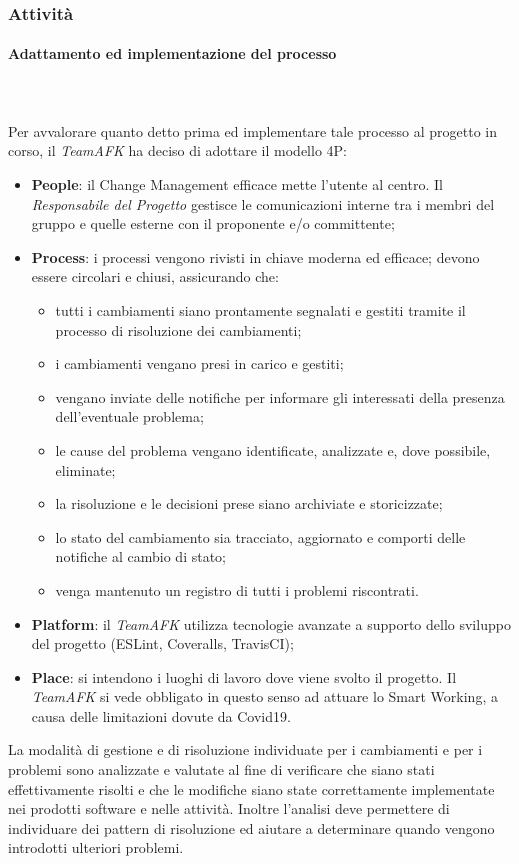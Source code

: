 \subsubsection{Attività}
\paragraph{Adattamento ed implementazione del processo}\mbox{} \\ \mbox{} \\
Per avvalorare quanto detto prima ed implementare tale processo al progetto in corso, il \textit{TeamAFK} ha deciso di adottare il modello 4P: \begin{itemize}
\item \textbf{People}: il Change Management efficace mette l'utente al centro. Il \textit{Responsabile del Progetto} gestisce le comunicazioni interne tra i membri del gruppo e quelle esterne con il proponente e/o committente;
\item \textbf{Process}: i processi vengono rivisti in chiave moderna ed efficace; devono essere circolari e chiusi, assicurando che: \begin{itemize}
\item tutti i cambiamenti siano prontamente segnalati e gestiti tramite il processo di risoluzione dei cambiamenti;
\item i cambiamenti vengano presi in carico e gestiti;
\item vengano inviate delle notifiche per informare gli interessati della presenza dell’eventuale problema;
\item le cause del problema vengano identificate, analizzate e, dove possibile, eliminate;
\item la risoluzione e le decisioni prese siano archiviate e storicizzate;
\item lo stato del cambiamento sia tracciato, aggiornato e comporti delle notifiche al cambio di stato;
\item venga mantenuto un registro di tutti i problemi riscontrati.
\end{itemize}
\item \textbf{Platform}: il \textit{TeamAFK} utilizza tecnologie avanzate a supporto dello sviluppo del progetto (ESLint, Coveralls, TravisCI);
\item \textbf{Place}: si intendono i luoghi di lavoro dove viene svolto il progetto. Il \textit{TeamAFK} si vede obbligato in questo senso ad attuare lo Smart Working, a causa delle limitazioni dovute da Covid19.
\end{itemize}
La modalità di gestione e di risoluzione individuate per i cambiamenti e per i problemi sono analizzate e valutate al fine di verificare che siano stati effettivamente risolti e che le modifiche siano state correttamente implementate nei prodotti software e nelle attività. Inoltre l’analisi deve permettere di individuare dei pattern di risoluzione ed aiutare a determinare quando vengono introdotti ulteriori problemi.

